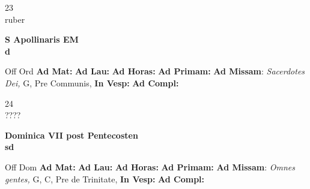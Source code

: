 \documentclass[10pt, openany]{book}
\begin{document}
    \begin{center}
        \begin{minipage}{3.5in}
            \vspace{2em}
            \begin{minipage}{0.5in}
                {\Huge 23} \\
                {\normalsize ruber}
            \end{minipage}
            \begin{minipage}{3.0in}
                \textbf{ \large S Apollinaris EM \\
                \textnormal{\normalsize d}}

            \end{minipage}
            \begin{justify}Off Ord
                \textbf{Ad Mat: }
                \textbf{Ad Lau: }
                \textbf{Ad Horas: }
                \textbf{Ad Primam: }\textbf{Ad Missam}: \textit{Sacerdotes Dei,} G, Pre Communis, 
                \textbf{In Vesp: }
                \textbf{Ad Compl: }
            \end{justify}
        \end{minipage}
    \end{center}

    \begin{center}
        \begin{minipage}{3.5in}
            \vspace{2em}
            \begin{minipage}{0.5in}
                {\Huge 24} \\
                {\normalsize ????}
            \end{minipage}
            \begin{minipage}{3.0in}
                \textbf{ \large Dominica VII post Pentecosten \\
                \textnormal{\normalsize sd}}

            \end{minipage}
            \begin{justify}Off Dom
                \textbf{Ad Mat: }
                \textbf{Ad Lau: }
                \textbf{Ad Horas: }
                \textbf{Ad Primam: }\textbf{Ad Missam}: \textit{Omnes gentes,} G, C, Pre de Trinitate, 
                \textbf{In Vesp: }
                \textbf{Ad Compl: }
            \end{justify}
        \end{minipage}
    \end{center}
\end{document}
